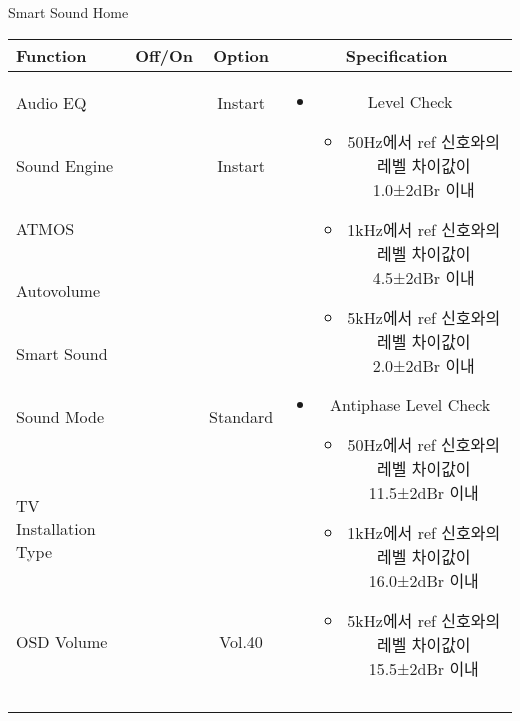 \begin{frame}[t]{Smart Sound Home}
\begin{tiny}
\begin{tabular}{@{}lccc@{}}
\toprule
Function & Off/On & Option & Specification \\
\midrule
Audio EQ & \color{black}{Off} & Instart &
\multirow{10}{60mm}{
\begin{itemize}
\item Level Check
	\begin{itemize}
	\item 50Hz에서 ref 신호와의 레벨 차이값이 1.0±2dBr 이내
	\item 1kHz에서 ref 신호와의 레벨 차이값이 4.5±2dBr 이내
	\item 5kHz에서 ref 신호와의 레벨 차이값이 2.0±2dBr 이내
	\end{itemize}
\item Antiphase Level Check
	\begin{itemize}
	\item 50Hz에서 ref 신호와의 레벨 차이값이 11.5±2dBr 이내
	\item 1kHz에서 ref 신호와의 레벨 차이값이 16.0±2dBr 이내
	\item 5kHz에서 ref 신호와의 레벨 차이값이 15.5±2dBr 이내
	\end{itemize}
\end{itemize}
} \\
Sound Engine & \color{blue}{On} & Instart & \\
ATMOS & \color{black}{Off}  & & \\
Autovolume & \color{black}{Off} & & \\
Smart Sound & \color{blue}{On} & & \\
Sound Mode & \color{blue}{On} & Standard & \\
TV Installation Type & \color{blue}{On} & \color{black}{Standtype1} & \\
OSD Volume & \color{blue}{On} & Vol.40 & \\
& & & \\
& & & \\
& & & \\
& & & \\
\midrule
\end{tabular}
\end{tiny}

\end{frame}
